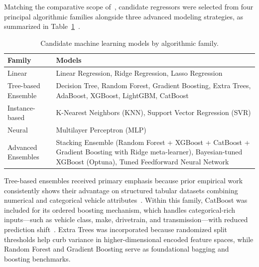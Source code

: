 Matching the comparative scope of~\cite{atique2026explainable}, candidate regressors were selected from four principal algorithmic families alongside three advanced modeling strategies, as summarized in Table~\ref{tab:model_families}~\cite{atique2026explainable}.

\begin{table}[H]
\centering
\renewcommand{\arraystretch}{1.2}
\begin{tabular}{|p{4cm}|p{10cm}|}
\hline
\textbf{Family} & \textbf{Models} \\ \hline

Linear &
Linear Regression, Ridge Regression, Lasso Regression \\ \hline

Tree-based Ensemble &
Decision Tree, Random Forest, Gradient Boosting, Extra Trees, AdaBoost, XGBoost, LightGBM, CatBoost \\ \hline

Instance-based &
K-Nearest Neighbors (KNN), Support Vector Regression (SVR) \\ \hline

Neural &
Multilayer Perceptron (MLP) \\ \hline

Advanced Ensembles &
Stacking Ensemble (Random Forest + XGBoost + CatBoost + Gradient Boosting with Ridge meta-learner), Bayesian-tuned XGBoost (Optuna), Tuned Feedforward Neural Network \\ \hline

\end{tabular}
\caption{Candidate machine learning models by algorithmic family.}
\label{tab:model_families}
\end{table}

Tree-based ensembles received primary emphasis because prior empirical work consistently shows their advantage on structured tabular datasets combining numerical and categorical vehicle attributes~\cite{atique2026explainable}\cite{grinsztajn2022tree}\cite{malashin2025boosting}. Within this family, CatBoost was included for its ordered boosting mechanism, which handles categorical-rich inputs---such as vehicle class, make, drivetrain, and transmission---with reduced prediction shift~\cite{atique2026explainable}. Extra Trees was incorporated because randomized split thresholds help curb variance in higher-dimensional encoded feature spaces, while Random Forest and Gradient Boosting serve as foundational bagging and boosting benchmarks.

